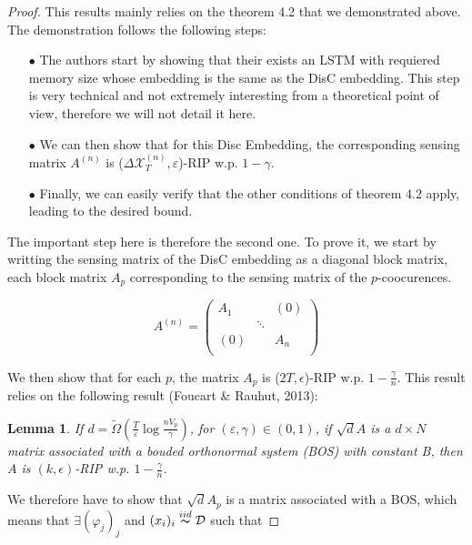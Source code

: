 \documentclass{article}
\newtheorem{lemma}[theorem]{Lemma}
\begin{document}
\begin{proof}

This results mainly relies on the theorem 4.2 that we demonstrated above. The demonstration follows the following steps:

\begin{itemize}
\item[$\bullet$] The authors start by showing that their exists an LSTM with requiered memory size whose embedding is the same as the DisC embedding. This step is very technical and not extremely interesting from a theoretical point of view, therefore we will not detail it here.
\item[$\bullet$] We can then show that for this Disc Embedding, the corresponding sensing matrix $A^{(n)}$ is ($\Delta \mathcal{X}_T^{(n)}, \varepsilon$)-RIP w.p. $1 - \gamma$.
\item[$\bullet$] Finally, we can easily verify that the other conditions of theorem 4.2 apply, leading to the desired bound.
\end{itemize}

The important step here is therefore the second one. To prove it, we start by writting the sensing matrix of the DisC embedding as a diagonal block matrix, each block matrix $A_p$ corresponding to the sensing matrix of the $p$-coocurences.

$$A^{(n)}=
    \left (
    \begin{array}{ccc}
        A_1 &  & (0) \\
                & \ddots&          \\
        (0) &  & A_n \\
    \end{array}
    \right )
$$

We then show that for each $p$, the matrix $A_p$ is ($2T, \epsilon$)-RIP w.p. $1 - \frac{\gamma}{n}$. This result relies on the following result (Foucart \& Rauhut, 2013): \\

\begin{lemma}
If $d = \tilde{\Omega}\left(\frac{T}{\varepsilon} \log \frac{n V_p}{\gamma}\right)$, for $(\varepsilon, \gamma) \in (0, 1)$, if $\sqrt{d} A$ is a $d \times N$ matrix associated with a bouded orthonormal system (BOS) with constant B, then $A$ is $(k, \epsilon)$-RIP w.p. $1 - \frac{\gamma}{n}$.
\end{lemma}

We therefore have to show that $\sqrt{d} A_p$ is a matrix associated with a BOS, which means that $\exists (\varphi_j)_j$ and $(x_i)_i \overset{iid}{\thicksim} \mathcal{D}$ such that


\end{proof}
\end{document}
